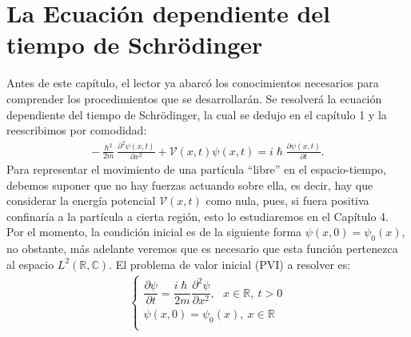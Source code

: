 \documentclass[12pt]{article}
\theoremstyle{definition}
\newcommand*{\field}[1]{\mathbb{#1}}
\begin{document}
\section{La Ecuación dependiente del tiempo de Schrödinger}
\noindent
Antes de este capítulo, el lector ya abarcó los conocimientos necesarios para comprender los procedimientos que se desarrollarán. Se resolverá la ecuación dependiente del tiempo de Schrödinger, la cual se dedujo en el capítulo 1 y la reescribimos por comodidad:
\begin{align*}
    -\frac{\hslash^2}{2m}\frac{\partial^2\psi(x,t)}{\partial x^2} + \mathcal{V}(x,t)\psi(x,t) = i\hslash\frac{\partial\psi(x,t)}{\partial t}.
\end{align*}
Para representar el movimiento de una partícula ``libre'' en el espacio-tiempo, debemos suponer que no hay fuerzas actuando sobre ella, es decir, hay que considerar la energía potencial $\mathcal{V}(x,t)$ como nula, pues, si fuera positiva confinaría a la partícula a cierta región, esto lo estudiaremos en el Capítulo 4. Por el momento, la condición inicial es de la siguiente forma $\psi(x,0) = \psi_{0}(x)$, no obstante, más adelante veremos que es necesario que esta función pertenezca al espacio $L^{2}(\field{R},\field{C})$. El problema de valor inicial (PVI) a resolver es:
    \begin{align}
         \left\{ \begin{array}{ll}
         \dfrac{\partial\psi}{\partial t} = \dfrac{i\hslash}{2m}\dfrac{\partial^2\psi}{\partial x^2},\:\:\:x\in\field{R},\:t>0 \\
         \psi(x,0) = \psi_{0}(x),\:x\in\field{R} \\
         \end{array}
\right.
\label{eq:TISchrodinger}
    \end{align}
\end{document}
